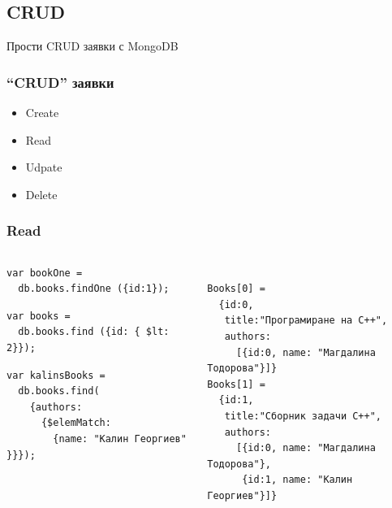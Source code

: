 \documentclass{beamer}
\begin{document}
\subsection{CRUD}

\begin{frame}
\centerline{Прости CRUD заявки с MongoDB}
\end{frame}

  

\begin{frame}[fragile]
\frametitle{``CRUD'' заявки}


\begin{itemize}
  \item Create
  \item Read
  \item Udpate
  \item Delete  
\end{itemize}

\end{frame}


\begin{frame}[fragile]
\frametitle{Read}

\lstset{language=JavaScript}


\begin{columns}
  \begin{column}{0.55\textwidth}

\begin{lstlisting}
var bookOne = 
  db.books.findOne ({id:1});
\end{lstlisting}


\begin{lstlisting}
var books = 
  db.books.find ({id: { $lt: 2}});
\end{lstlisting}


\begin{lstlisting}
var kalinsBooks = 
  db.books.find( 
    {authors: 
      {$elemMatch: 
        {name: "Калин Георгиев" }}});
\end{lstlisting}

  \end{column}
  \begin{column}{0.45\textwidth}
\begin{lstlisting}

Books[0] = 
  {id:0, 
   title:"Програмиране на C++", 
   authors:
     [{id:0, name: "Магдалина Тодорова"}]}
Books[1] = 
  {id:1, 
   title:"Сборник задачи C++", 
   authors:
     [{id:0, name: "Магдалина Тодорова"},
      {id:1, name: "Калин Георгиев"}]} 
\end{lstlisting}
  \end{column}
\end{columns}


\end{frame}
\end{document}
